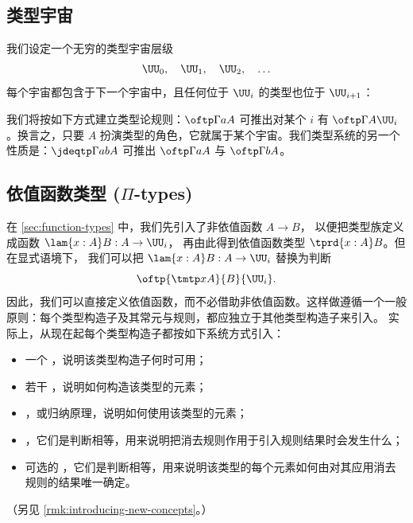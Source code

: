 %
%

\subsection{类型宇宙}

%

我们设定一个无穷的类型宇宙层级
%
\begin{equation*}
  \UU_0, \quad \UU_1, \quad  \UU_2, \quad \ldots
\end{equation*}
%
每个宇宙都包含于下一个宇宙中，且任何位于 $\UU_i$ 的类型也位于 $\UU_{i+1}$：
%
%
我们将按如下方式建立类型论规则：$\oftp\Gamma{a}{A}$
可推出对某个 $i$ 有 $\oftp\Gamma{A}{\UU_i}$。换言之，只要 $A$ 扮演类型的角色，它就属于某个宇宙。我们类型系统的另一个性质是：$\jdeqtp\Gamma{a}{b}{A}$
可推出 $\oftp\Gamma{a}{A}$ 与 $\oftp\Gamma{b}{A}$。

\subsection{依值函数类型 (\texorpdfstring{$\Pi$}{Π}-types)}
\label{sec:more-formal-pi}

%
%

在 \cref{sec:function-types} 中，我们先引入了非依值函数 $A\to B$，
以便把类型族定义成函数 $\lam{x:A} B:A\to\UU_i$，
再由此得到依值函数类型 $\tprd{x:A} B$。但在显式语境下，
我们可以把 $\lam{x:A} B:A\to\UU_i$ 替换为判断
%
\begin{equation*}
  \oftp{\tmtp xA}{B}{\UU_i}.
\end{equation*}
%
因此，我们可以直接定义依值函数，而不必借助非依值函数。这样做遵循一个一般原则：每个类型构造子及其常元与规则，都应独立于其他类型构造子来引入。
%
实际上，从现在起每个类型构造子都按如下系统方式引入：
\begin{itemize}
\item 一个 ，说明该类型构造子何时可用；
\item 若干 ，说明如何构造该类型的元素；
\item {}，或归纳原理，说明如何使用该类型的元素；
\item {}，它们是判断相等，用来说明把消去规则作用于引入规则结果时会发生什么；
\item 可选的 ，它们是判断相等，用来说明该类型的每个元素如何由对其应用消去规则的结果唯一确定。
\end{itemize}
（另见 \cref{rmk:introducing-new-concepts}。）


